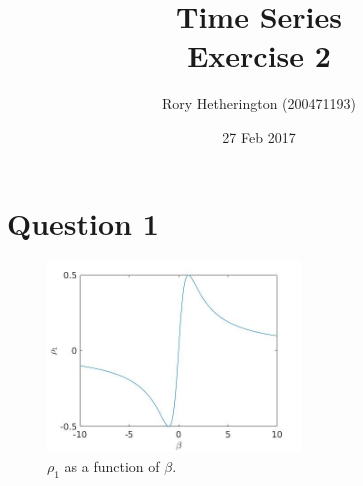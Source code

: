 \documentclass[a4paper]{article}
\title{Time Series\\ Exercise 2}
\author{Rory Hetherington (200471193)}
\date{27 Feb 2017}
\begin{document}
\maketitle


\section*{Question 1}

\begin{figure}
	\centering
	\includegraphics[width=0.6\textwidth]{ex_2_4}
	\caption{$\rho_1$ as a function of  $\beta$.}
	\label{fig:ex_2_4}
\end{figure}
\end{document}
